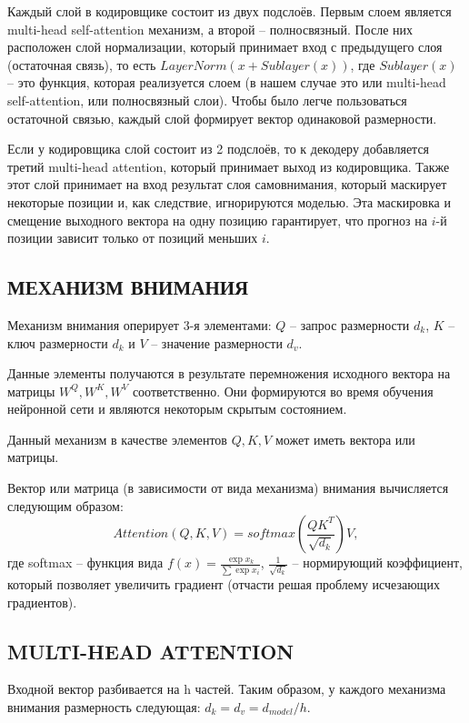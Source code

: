     Каждый слой в кодировщике состоит из двух подслоёв. Первым слоем является multi-head self-attention механизм, а второй -- полносвязный. После них расположен слой нормализации, который принимает вход с предыдущего слоя (остаточная связь), то есть $ LayerNorm(x + Sublayer(x)) $, где $ Sublayer(x) $ -- это функция, которая реализуется слоем (в нашем случае это или multi-head self-attention, или полносвязный слои). Чтобы было легче пользоваться остаточной связью, каждый слой формирует вектор одинаковой размерности. 
    
    Если у кодировщика слой состоит из 2 подслоёв, то к декодеру добавляется третий multi-head attention, который принимает выход из кодировщика. Также этот слой принимает на вход результат слоя самовнимания, который маскирует некоторые позиции и, как следствие, игнорируются моделью. Эта маскировка и смещение выходного вектора на одну позицию гарантирует, что прогноз на $i$-й позиции зависит только от позиций меньших $i$.

\subsection{МЕХАНИЗМ ВНИМАНИЯ}
    Механизм внимания оперирует 3-я элементами: $Q$ -- запрос размерности $ d_k $, $K$ -- ключ размерности $ d_k $ и $V$ -- значение размерности $ d_v $.
    
    Данные элементы получаются в результате перемножения исходного вектора на матрицы $W^Q, W^K, W^V$ соответственно. Они формируются во время обучения нейронной сети и являются некоторым скрытым состоянием.
    
    Данный механизм в качестве элементов $Q, K, V$ может иметь вектора или матрицы.
    
    Вектор или матрица (в зависимости от вида механизма) внимания вычисляется следующим образом:
    $$ Attention(Q, K, V) = softmax(\frac{QK^T}{\sqrt{d_k}})V, $$
    где softmax -- функция вида $f(x) = \frac{\exp{x_k}}{\sum \exp{x_i}}$, $\frac{1}{\sqrt{d_k}}$ -- нормирующий коэффициент, который позволяет увеличить градиент (отчасти решая проблему исчезающих градиентов).
    
\subsection{MULTI-HEAD ATTENTION}
    Входной вектор разбивается на h частей. Таким образом, у каждого механизма внимания размерность следующая: $d_k = d_v = d_{model} / h$.
    
